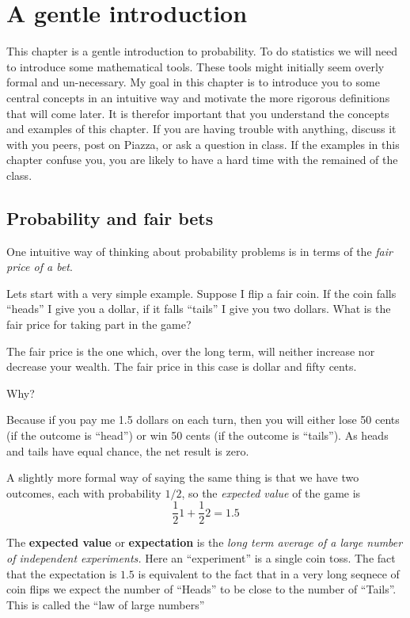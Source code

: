 \chapter{A gentle introduction}

This chapter is a gentle introduction to probability. To do statistics
we will need to introduce some mathematical tools. These tools might
initially seem overly formal and un-necessary. My goal in this chapter
is to introduce you to some central concepts in an intuitive way and
motivate the more rigorous definitions that will come later. It is
therefor important that you understand the concepts and examples of
this chapter. If you are having trouble with anything, discuss it with
you peers, post on Piazza, or ask a question in class. If the examples
in this chapter confuse you, you are likely to have a hard time with
the remained of the class.

\section{Probability and fair bets}

One intuitive way of thinking about probability problems is in terms
of the {\em fair price of a bet}.

Lets start with a very simple example. Suppose I flip a fair coin.
If the coin falls ``heads'' I give you a dollar, if it falls ``tails''
I give you two dollars. What is the fair price for taking part in the
game?

The fair price is the one which, over the long term, will neither
increase nor decrease your wealth. The fair price in this case is
dollar and fifty cents.

Why?

Because if you pay me 1.5 dollars on each turn, then you will either
lose 50 cents (if the outcome is ``head'') or win 50 cents (if the
outcome is ``tails''). As heads and tails have equal chance, the net
result is zero.

A slightly more formal way of saying the same thing is that we have
two outcomes, each with probability $1/2$, so the {\em expected value}
of the game is 
\[
\frac{1}{2} 1 + \frac{1}{2} 2 = 1.5
\]

The {\bf expected value} or {\bf expectation} is the {\em long term
  average of a large number of independent experiments.} Here an
``experiment'' is a single coin toss. The fact that the expectation is
$1.5$ is equivalent to the fact that in a very long seqnece of coin
flips we expect the number of ``Heads'' to be close to the number of
``Tails''. This is called the ``law of large numbers''

